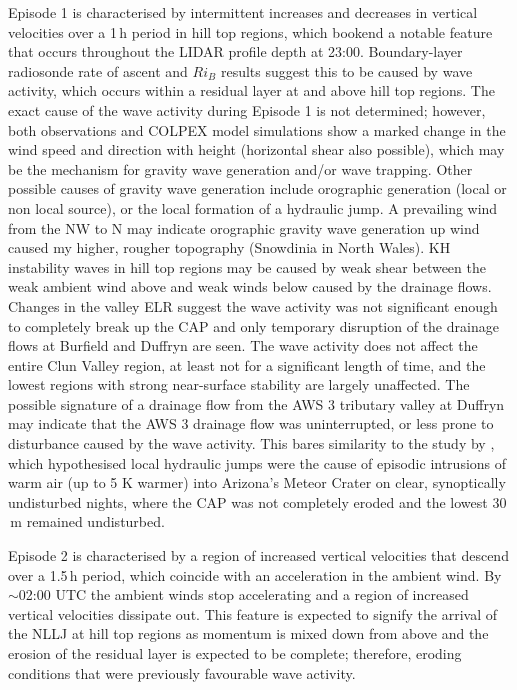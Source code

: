 \documentclass[times]{qjrms4}
\begin{document}
Episode 1 is characterised by intermittent increases and decreases in vertical velocities over a 1$\,\mbox{h}$ period in hill top regions, which bookend a notable feature that occurs throughout the LIDAR profile depth at 23:00. Boundary-layer radiosonde rate of ascent and $Ri_B$ results suggest this to be caused by wave activity, which occurs within a residual layer at and above hill top regions. The exact cause of the wave activity during Episode 1 is not determined; however, both observations and COLPEX model simulations \citep{Vosper2013narrow} show a marked change in the wind speed and direction with height (horizontal shear also possible), which may be the mechanism for gravity wave generation and/or wave trapping. Other possible causes of gravity wave generation include orographic generation (local or non local source), or the local formation of a hydraulic jump. A prevailing wind from the NW to N may indicate orographic gravity wave generation up wind caused my higher, rougher topography (Snowdinia in North Wales). KH instability waves in hill top regions may be caused by weak shear between the weak ambient wind above and weak winds below caused by the drainage flows. Changes in the valley ELR suggest the wave activity was not significant enough to completely break up the CAP and only temporary disruption of the drainage flows at Burfield and Duffryn are seen. The wave activity does not affect the entire Clun Valley region, at least not for a significant length of time, and the lowest regions with strong near-surface stability are largely unaffected. The possible signature of a drainage flow from the AWS 3 tributary valley at Duffryn may indicate that the AWS 3 drainage flow was uninterrupted, or less prone to disturbance caused by the wave activity. This bares similarity to the study by \citet{adler2012warm}, which hypothesised local hydraulic jumps were the cause of episodic intrusions of warm air (up to 5 K warmer) into Arizona’s Meteor Crater on clear, synoptically undisturbed nights, where the CAP was not completely eroded and the lowest 30$\,\mbox{m}$ remained undisturbed.

Episode 2 is characterised by a region of increased vertical velocities that descend over a 1.5$\,\mbox{h}$ period, which coincide with an acceleration in the ambient wind. By $\sim$02:00 UTC the ambient winds stop accelerating and a region of increased vertical velocities dissipate out. This feature is expected to signify the arrival of the NLLJ at hill top regions as momentum is mixed down from above and the erosion of the residual layer is expected to be complete; therefore, eroding conditions that were previously favourable wave activity.
\end{document}
